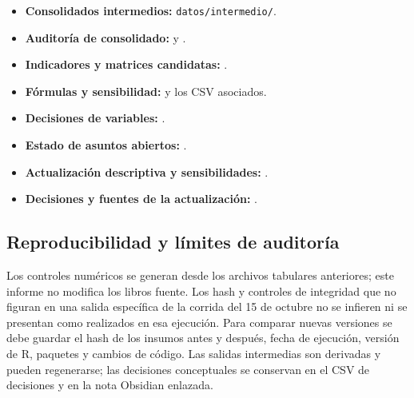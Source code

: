 \begin{singlespace}
\begin{itemize}[leftmargin=1.27cm]
  \item \textbf{Consolidados intermedios:} \texttt{datos/intermedio/}.
  \item \textbf{Auditoría de consolidado:}  y .
  \item \textbf{Indicadores y matrices candidatas:} .
  \item \textbf{Fórmulas y sensibilidad:}  y los CSV asociados.
  \item \textbf{Decisiones de variables:} .
  \item \textbf{Estado de asuntos abiertos:} .
  \item \textbf{Actualización descriptiva y sensibilidades:} .
  \item \textbf{Decisiones y fuentes de la actualización:} .
\end{itemize}

\subsection{Reproducibilidad y límites de auditoría}

Los controles numéricos se generan desde los archivos tabulares anteriores; este informe no modifica los libros fuente. Los hash y controles de integridad que no figuran en una salida específica de la corrida del 15 de octubre no se infieren ni se presentan como realizados en esa ejecución. Para comparar nuevas versiones se debe guardar el hash de los insumos antes y después, fecha de ejecución, versión de R, paquetes y cambios de código. Las salidas intermedias son derivadas y pueden regenerarse; las decisiones conceptuales se conservan en el CSV de decisiones y en la nota Obsidian enlazada.
\normalsize\end{singlespace}
